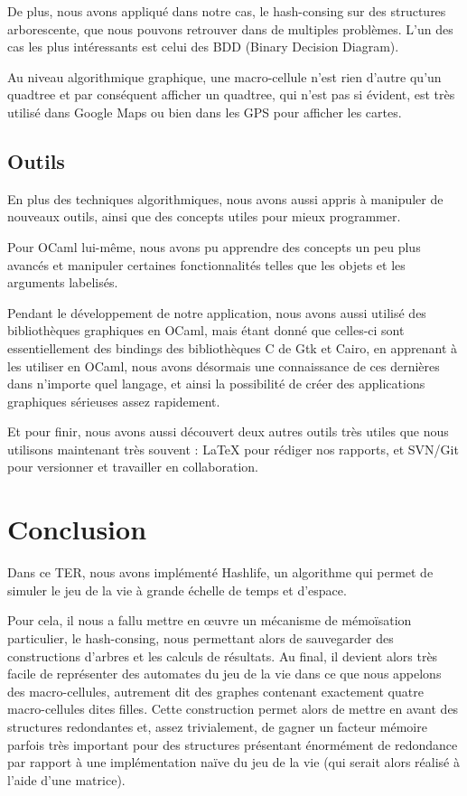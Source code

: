 \documentclass[a4paper,12pt]{report}
\begin{document}
De plus, nous avons appliqué dans notre cas, le hash-consing sur des
structures arborescente, que nous pouvons retrouver dans de multiples
problèmes. L'un des cas les plus intéressants est celui des BDD (Binary
Decision Diagram).

Au niveau algorithmique graphique, une macro-cellule n'est rien
d'autre qu'un quadtree et par conséquent afficher un quadtree, qui
n'est pas si évident, est très utilisé dans Google Maps ou bien dans
les GPS pour afficher les cartes.

\section{Outils}

En plus des techniques algorithmiques, nous avons aussi appris à manipuler de
nouveaux outils, ainsi que des concepts utiles pour
mieux programmer.

\medskip

Pour OCaml lui-même, nous avons pu apprendre des concepts un peu plus
avancés et manipuler certaines fonctionnalités telles que les objets
et les arguments labelisés. 

Pendant le développement de notre application, nous avons aussi
utilisé des bibliothèques graphiques en OCaml, mais étant donné que
celles-ci sont essentiellement des bindings des bibliothèques C de Gtk
et Cairo, en apprenant à les utiliser en OCaml, nous avons désormais
une connaissance de ces dernières dans n'importe quel langage, et
ainsi la possibilité de créer des applications graphiques sérieuses
assez rapidement.

Et pour finir, nous avons aussi découvert deux autres outils très
utiles que nous utilisons maintenant très souvent : LaTeX pour rédiger
nos rapports, et SVN/Git pour versionner et travailler en
collaboration.


\medskip

\chapter{Conclusion}

Dans ce TER, nous avons implémenté Hashlife, un algorithme qui permet
de simuler le jeu de la vie à grande échelle de temps et d'espace.

\medskip

Pour cela, il nous a fallu mettre en \oe uvre un mécanisme de
mémoïsation particulier, le hash-consing, nous permettant alors de
sauvegarder des constructions d'arbres et les calculs de résultats. Au
final, il devient alors très facile de représenter des automates du
jeu de la vie dans ce que nous appelons des macro-cellules, autrement
dit des graphes contenant exactement quatre macro-cellules dites
filles. Cette construction permet alors de mettre en avant des
structures redondantes et, assez trivialement, de gagner un facteur
mémoire parfois très important pour des structures présentant
énormément de redondance par rapport à une implémentation naïve du jeu
de la vie (qui serait alors réalisé à l'aide d'une matrice).
\end{document}
